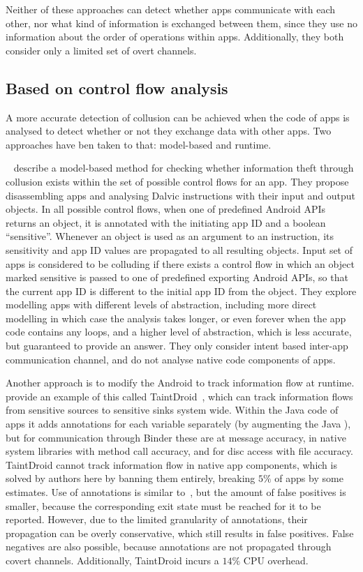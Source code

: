 \documentclass[article]{aaltoseries}
\renewcommand\gls\cgls
\begin{document}
Neither of these approaches can detect whether apps communicate with each other, nor what kind of information is exchanged between them, since they use no information about the order of operations within apps. Additionally, they both consider only a limited set of overt channels.

\subsection{Based on control flow analysis}
\label{sec:flow}

A more accurate detection of collusion can be achieved when the code of apps is analysed to detect whether or not they exchange data with other apps. Two approaches have ben taken to that: model-based and runtime.

\citeauthor{Asavoae2018}~\cite{Asavoae2018} describe a model-based method for checking whether information theft through collusion exists within the set of possible control flows for an app. They propose disassembling apps and analysing Dalvic \gls{vm} instructions with their input and output objects. In all possible control flows, when one of predefined Android APIs returns an object, it is annotated with the initiating app ID and a boolean ``sensitive''. Whenever an object is used as an argument to an instruction, its sensitivity and app ID values are propagated to all resulting objects. Input set of apps is considered to be colluding if there exists a control flow in which an object marked sensitive is passed to one of predefined exporting Android APIs, so that the current app ID is different to the initial app ID from the object. They explore modelling apps with different levels of abstraction, including more direct modelling in which case the analysis takes longer, or even forever when the app code contains any loops, and a higher level of abstraction, which is less accurate, but guaranteed to provide an answer. They only consider intent based inter-app communication channel, and do not analyse native code components of apps.

Another approach is to modify the Android \gls{os} to track information flow at runtime. \citeauthor{Enck2014} provide an example of this called TaintDroid~\cite{Enck2014}, which can track information flows from sensitive sources to sensitive sinks system wide. Within the Java code of apps it adds annotations for each variable separately (by augmenting the Java \gls{vm}), but for communication through Binder these are at message accuracy, in native system libraries with method call accuracy, and for disc access with file accuracy. TaintDroid cannot track information flow in native app components, which is solved by authors here by banning them entirely, breaking $5\%$ of apps by some estimates. Use of annotations is similar to~\cite{Asavoae2018}, but the amount of false positives is smaller, because the corresponding exit state must be reached for it to be reported. However, due to the limited granularity of annotations, their propagation can be overly conservative, which still results in false positives. False negatives are also possible, because annotations are not propagated through covert channels. Additionally, TaintDroid incurs a $14\%$ CPU overhead.
\end{document}
